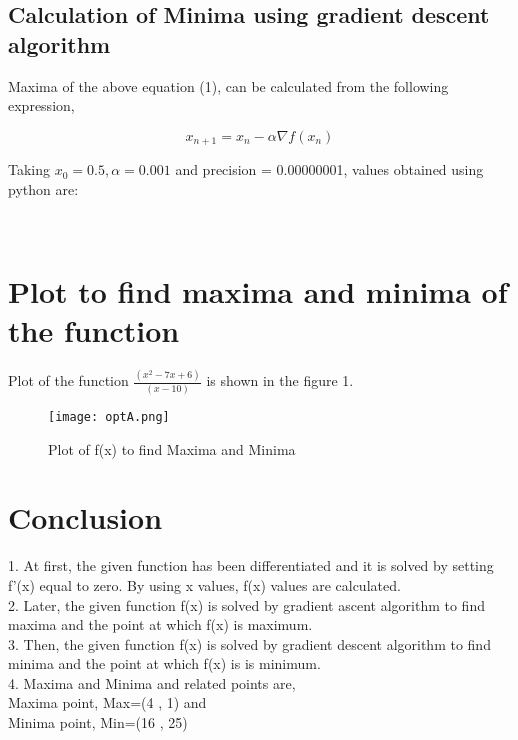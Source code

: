 \documentclass[10pt,twocolumn]{article}
\begin{document}
\begin{flushleft}
\begin{flushleft}
\subsection{Calculation of Minima using gradient descent algorithm}
\end{flushleft}
\begin{flushleft}
Maxima of the above equation (1), can be calculated from the following expression,\\
\end{flushleft}
    \begin{equation}
        x_{n+1}= x_n - \alpha \nabla f(x_n) 
    \end{equation}
\begin{flushleft}
Taking $x_0=0.5,\alpha=0.001$ and precision = 0.00000001, values obtained using python are:
\end{flushleft}
\center
        \\
        \vspace{0.45cm}
\endcenter
\section{Plot to find maxima and minima of the function}
\vspace{0.25cm}
Plot of the function $\frac{(x^2-7x+6)}{(x-10)}$ is shown in the figure 1.
\begin{figure}[h]
\texttt{[image: optA.png]}
\caption{Plot of f(x) to find Maxima and Minima}
\label{Optimization of Machince A and B}
\end{figure}

\section{Conclusion}
\begin{flushleft}
1. At first, the given function has been differentiated and it is solved by setting f'(x) equal to zero. By using x values, f(x) values are calculated.\\
\vspace{0.25cm}
2. Later, the given function f(x) is solved by gradient ascent algorithm to find maxima and the point at which f(x) is maximum.\\
\vspace{0.25cm}
3. Then, the given function f(x) is solved by gradient descent algorithm to find minima and the point at which f(x) is is minimum.\\
\vspace{0.25cm}
4. Maxima and Minima and related points are, \\
\vspace{0.25cm}
\center
Maxima point, Max=(4 , 1) and\\ 
\vspace{0.2cm}
Minima point, Min=(16 , 25)
\end{flushleft}
\endcenter
\end{flushleft}
\end{document}
